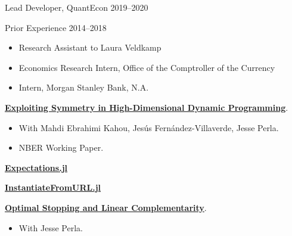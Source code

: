 \documentclass[12pt,article,oneside]{memoir}   %
\begin{document}
Lead Developer, QuantEcon \hfill 2019--2020\vspace{0.1in}

Prior Experience \hfill 2014--2018
\begin{itemize}\setlength{\leftskip}{1cm}
  \item Research Assistant to Laura Veldkamp
  \item Economics Research Intern, Office of the Comptroller of the Currency
  \item Intern, Morgan Stanley Bank, N.A.
\end{itemize}

{\vskip 0.1in}
\bigskip


\setlength{\leftskip}{0cm}

\textbf{\href{https://www.nber.org/papers/w28981}{Exploiting Symmetry in High-Dimensional Dynamic Programming}}. 
\begin{itemize}
  \setlength{\leftskip}{1cm} \item  With Mahdi Ebrahimi Kahou, Jes\'{u}s Fern\'{a}ndez-Villaverde, Jesse Perla.
  \item NBER Working Paper.
\end{itemize} 

{\vskip 0.1in}
\bigskip

\setlength{\leftskip}{0cm}

\textbf{\href{https://github.com/QuantEcon/expectations.jl}{Expectations.jl}}  \vspace{0.1in}

\textbf{\href{https://github.com/QuantEcon/InstantiateFromURL.jl}{InstantiateFromURL.jl}}  

{\vskip 0.1in}
\bigskip

\setlength{\leftskip}{0cm}

\textbf{\href{https://notes.quantecon.org/submission/5c832d2be7b4c5000f4c8e48}{Optimal Stopping and Linear Complementarity}}. 
\begin{itemize}
  \setlength{\leftskip}{1cm} \item  With Jesse Perla. 
\end{itemize} \vspace{0.1in}

\end{document}
